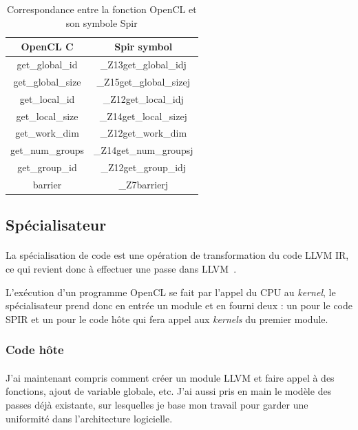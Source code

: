 \begin{table}[h]
   \begin{center}
      \begin{tabular}{|c|c|}
         \hline
         OpenCL C & Spir symbol \\
         \hline
         get\_global\_id & \_Z13get\_global\_idj \\
         \hline
         get\_global\_size & \_Z15get\_global\_sizej \\
         \hline
         get\_local\_id & \_Z12get\_local\_idj \\
         \hline
         get\_local\_size & \_Z14get\_local\_sizej \\
         \hline
         get\_work\_dim & \_Z12get\_work\_dim \\
         \hline
         get\_num\_groups & \_Z14get\_num\_groupsj \\
         \hline
         get\_group\_id & \_Z12get\_group\_idj \\
         \hline
         barrier & \_Z7barrierj \\
         \hline
      \end{tabular}
   \end{center}
   \caption{Correspondance entre la fonction OpenCL et son symbole Spir}
   \label{spir_mangling}
\end{table}

\subsection{Spécialisateur}
\paragraph{}
La spécialisation de code est une opération de transformation du code LLVM IR,
ce qui revient donc à effectuer une passe dans LLVM~\cite{llvm_pass}.

L'exécution d'un programme OpenCL se fait par l'appel du CPU au \emph{kernel},
le spécialisateur prend donc en entrée un module et en fourni deux : un pour
le code SPIR et un pour le code hôte qui fera appel aux \emph{kernels} du
premier module.

\subsubsection{Code hôte}
\paragraph{}
J'ai maintenant compris comment créer un module LLVM et faire appel à des
fonctions, ajout de variable globale, etc. J'ai aussi pris en main le modèle des
passes déjà existante, sur lesquelles je base mon travail pour garder une
uniformité dans l'architecture logicielle.

